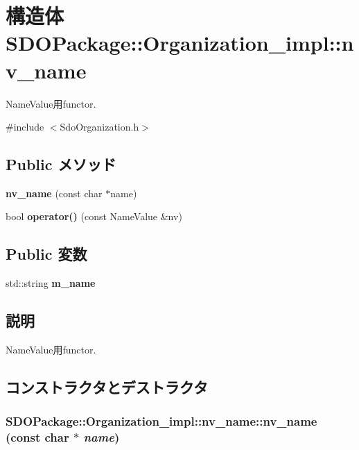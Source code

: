 \section{構造体 SDOPackage::Organization\_\-impl::nv\_\-name}
\label{structSDOPackage_1_1Organization__impl_1_1nv__name}


NameValue用functor.  




{\ttfamily \#include $<$SdoOrganization.h$>$}

\subsection*{Public メソッド}
\begin{DoxyCompactItemize}
\item 
{\bf nv\_\-name} (const char $\ast$name)
\item 
bool {\bf operator()} (const NameValue \&nv)
\end{DoxyCompactItemize}
\subsection*{Public 変数}
\begin{DoxyCompactItemize}
\item 
std::string {\bf m\_\-name}
\end{DoxyCompactItemize}


\subsection{説明}
NameValue用functor. 

\subsection{コンストラクタとデストラクタ}
\subsubsection[{nv\_\-name}]{\setlength{\rightskip}{0pt plus 5cm}SDOPackage::Organization\_\-impl::nv\_\-name::nv\_\-name (const char $\ast$ {\em name})\hspace{0.3cm}{\ttfamily  [inline]}}\label{structSDOPackage_1_1Organization__impl_1_1nv__name_a36d18d35879c0f347b86b3c29f0f12fc}


